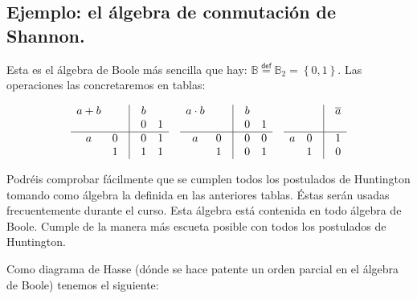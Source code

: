 \documentclass[final,12pt,a4paper,twoside,fleqn]{extbook}
\newcommand{\mathdef}{\ensuremath{\stackrel{\mathsf{def}}{{}={}}}}
\newcommand{\set}[1]{\ensuremath{\left\lbrace{#1}\right\rbrace}}
\newcommand{\setB}{\ensuremath{\mathbb{B}}}
\theoremstyle{definition}
\theoremstyle{remark}
\begin{document}
\subsection{Ejemplo: el álgebra de conmutación de Shannon.}



	Esta es el álgebra de Boole más sencilla que hay: \(\setB \mathdef
{\setB}_2 = \set{0,1}\). Las operaciones las concretaremos en tablas:



\[
  \begin{matrix}
   a + b & {} & \vline & b & {} \\
   {} & {} & \vline & 0 &  1 \\
    \hline
   {a} & {0} & \vline  &  0 & 1 \\
   {} & {1} & \vline  &  1 & 1 \\
  \end{matrix}
  \qquad
  \begin{matrix}
   a \cdot b & {} & \vline & b & {} \\
   {} & {} & \vline & 0 &  1 \\
    \hline
   {a} & {0} & \vline  &  0 & 0 \\
   {} & {1} & \vline  &  0 & 1 \\
  \end{matrix}
  \qquad
  \begin{matrix}
    {} & {} & \vline & {\overline a} \\
    {} & {} & \vline & {} \\
    \hline
    a & 0 & \vline &  1 \\
    {} & 1 & \vline &  0 \\
  \end{matrix}
\]



Podréis comprobar fácilmente que se cumplen todos los postulados de
Huntington tomando como álgebra la definida en las anteriores tablas. Éstas
serán usadas frecuentemente durante el curso. Esta álgebra está contenida en
todo álgebra de Boole. Cumple de la manera más escueta posible con todos los
postulados de Huntington.



Como diagrama de Hasse (dónde se hace patente un orden parcial en el álgebra
de Boole) tenemos el siguiente:

\begin{center}
\end{center}
\end{document}
